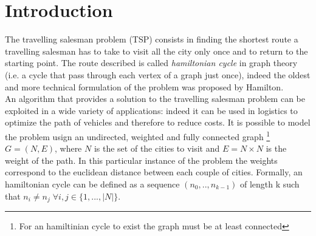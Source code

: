 \documentclass{article}
\begin{document}
\newpage

\section{Introduction}
The travelling salesman problem (TSP) consists in finding the shortest route a travelling salesman has to take to visit all the city only once and to return to the starting point. The route described is called \textit{hamiltonian cycle} in graph theory (i.e. a cycle that pass through each vertex of a graph just once), indeed the oldest and more technical formulation of the problem was proposed by Hamilton. \\
An algorithm that provides a solution to the travelling salesman problem can be exploited in a wide variety of applications: indeed it can be used in logistics to optimize the path of vehicles and therefore to reduce costs.
It is possible to model the problem usign an undirected, weighted and fully connected graph \footnote{For an hamiltinian cycle to exist the graph must be at least connected} $G = (N,E)$, where $N$ is the set of the cities to visit and $E =  N \times N$ is the weight of the path. In this particular instance of the problem the weights correspond to the euclidean distance between each couple of cities.
Formally, an hamiltonian cycle can be defined as a sequence $(n_0, .., n_{k-1})$ of length k such that $n_i \neq n_j \; \forall i,j \in \{1,..., |N|\}$. \\
\end{document}
